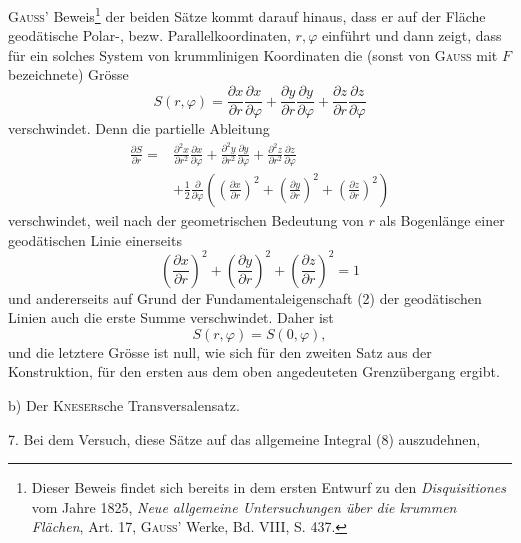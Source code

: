 \textsc{Gauss}’ Beweis\footnote{Dieser Beweis findet sich bereits in dem ersten Entwurf zu den \textit{Disquisitiones} vom Jahre 1825,
\textit{Neue allgemeine Untersuchungen über die krummen Flächen}, Art. 17, \textsc{Gauss}’ Werke, Bd. VIII, S. 437.} der beiden Sätze kommt darauf hinaus, dass er auf der
Fläche geodätische Polar-, bezw. Parallelkoordinaten, $r,\varphi$ einführt und dann
zeigt, dass für ein solches System von krummlinigen Koordinaten die (sonst
von \textsc{Gauss} mit $F$ bezeichnete) Grösse
\begin{equation*}\tag{9}
S(r,\varphi)=\frac{\partial x}{\partial r}\frac{\partial x}{\partial\varphi}
+\frac{\partial y}{\partial r}\frac{\partial y}{\partial\varphi}
+\frac{\partial z}{\partial r}\frac{\partial z}{\partial\varphi}
\end{equation*}
verschwindet. Denn die partielle Ableitung
\[
\begin{aligned}
\frac{\partial S}{\partial r}={}&\frac{\partial^2x}{\partial r^2}\frac{\partial x}{\partial\varphi}
+\frac{\partial^2y}{\partial r^2}\frac{\partial y}{\partial\varphi}
+\frac{\partial^2z}{\partial r^2}\frac{\partial z}{\partial\varphi}\\
&+\frac12\frac{\partial}{\partial\varphi}\left(\left(\frac{\partial x}{\partial r}\right)^2+\left(\frac{\partial y}{\partial r}\right)^2+\left(\frac{\partial z}{\partial r}\right)^2\right)
\end{aligned}
\]
verschwindet, weil nach der geometrischen Bedeutung von $r$ als Bogenlänge
einer geodätischen Linie einerseits
\clearpage{}
\begin{equation*}\tag{10}
\left(\frac{\partial x}{\partial r}\right)^2+\left(\frac{\partial y}{\partial r}\right)^2+\left(\frac{\partial z}{\partial r}\right)^2=1
\end{equation*}
und andererseits auf Grund der Fundamentaleigenschaft (2) der geodätischen
Linien auch die erste Summe verschwindet. Daher ist
\begin{equation*}\tag{11}
S(r,\varphi)=S(0,\varphi),
\end{equation*}
und die letztere Grösse ist null, wie sich für den zweiten Satz aus der Konstruktion,
für den ersten aus dem oben angedeuteten Grenzübergang ergibt.
\par\noindent\hspace*{\parindent}b) Der \textsc{Kneser}sche Transversalensatz.
\par\noindent\hspace*{\parindent}7. Bei dem Versuch, diese Sätze auf das allgemeine Integral (8) auszudehnen,
